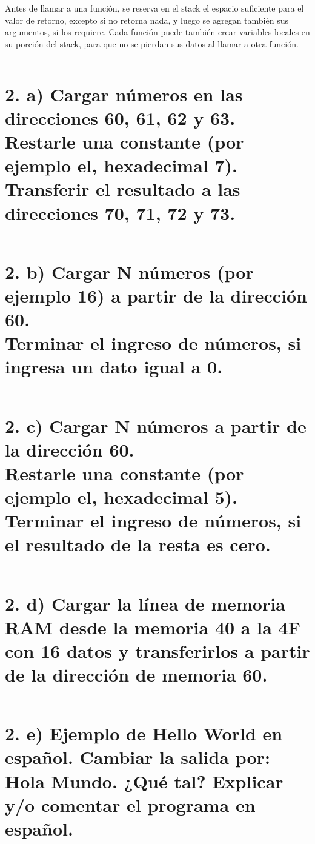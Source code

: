\documentclass{article}
\begin{document}
Antes de llamar a una función, se reserva en el stack el espacio suficiente para el valor de retorno, excepto si no retorna nada, y luego se agregan también sus argumentos, si los requiere. Cada función puede también crear variables locales en su porción del stack, para que no se pierdan sus datos al llamar a otra función.

\inputminted{nasm}{./code/1e.txt}

\section*{  2. a) Cargar números en las direcciones 60, 61, 62 y 63.\\
            Restarle una constante (por ejemplo el, hexadecimal 7).\\
            Transferir el resultado a las direcciones 70, 71, 72 y 73.}

\inputminted{nasm}{./code/2a.txt}

\section*{  2. b) Cargar N números (por ejemplo 16) a partir de la dirección 60.\\
            Terminar el ingreso de números, si ingresa un dato igual a 0.}

\inputminted{nasm}{./code/2b.txt}

\section*{  2. c) Cargar N números a partir de la dirección 60.\\
            Restarle una constante (por ejemplo el, hexadecimal 5).\\
            Terminar el ingreso de números, si el resultado de la resta es cero.}

\inputminted{nasm}{./code/2c.txt}

\section*{  2. d) Cargar la línea de memoria RAM desde la memoria 40 a la 4F con 16 datos y transferirlos a partir de la dirección de memoria 60.}

\inputminted{nasm}{./code/2d.txt}

\section*{  2. e) Ejemplo de Hello World en español. Cambiar la salida por: Hola Mundo. ¿Qué tal? Explicar y/o comentar el programa en español.}

\inputminted{nasm}{./code/2e.txt}
\end{document}
